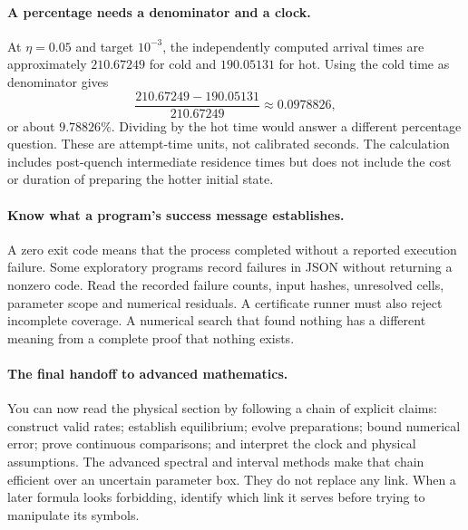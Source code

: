\paragraph{A percentage needs a denominator and a clock.}
At $\eta=0.05$ and target $10^{-3}$, the independently computed arrival
times are approximately $210.67249$ for cold and $190.05131$ for hot.
Using the cold time as denominator gives
\[
 \frac{210.67249-190.05131}{210.67249}\approx0.0978826,
\]
or about $9.78826\%$. Dividing by the hot time would answer a different
percentage question. These are attempt-time units, not calibrated seconds.
The calculation includes post-quench intermediate residence times but does
not include the cost or duration of preparing the hotter initial state.

\paragraph{Know what a program's success message establishes.}
A zero exit code means that the process completed without a reported
execution failure. Some exploratory programs record failures in JSON
without returning a nonzero code. Read the recorded failure counts, input
hashes, unresolved cells, parameter scope and numerical residuals. A
certificate runner must also reject incomplete coverage. A numerical
search that found nothing has a different meaning from a complete proof
that nothing exists.

\paragraph{The final handoff to advanced mathematics.}
You can now read the physical section by following a chain of explicit
claims: construct valid rates; establish equilibrium; evolve preparations;
bound numerical error; prove continuous comparisons; and interpret the
clock and physical assumptions. The advanced spectral and interval
methods make that chain efficient over an uncertain parameter box.
They do not replace any link. When a later formula looks forbidding,
identify which link it serves before trying to manipulate its symbols.
